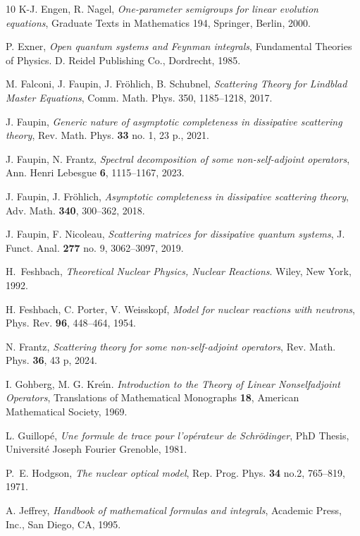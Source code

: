 \documentclass{article}
\begin{document}
\begin{thebibliography}{10}
K-J. Engen, R. Nagel, 
\emph{One-parameter semigroups for linear evolution equations},
Graduate Texts in Mathematics 194, Springer, Berlin, 2000.

P. Exner,
\emph{Open quantum systems and {F}eynman integrals},
Fundamental Theories of Physics. D. Reidel Publishing Co., Dordrecht, 1985.

M. Falconi, J. Faupin, J. Fr\"ohlich, B. Schubnel, 
\emph{Scattering {T}heory for {L}indblad {M}aster {E}quations}, 
Comm. Math. Phys. 350, 1185--1218, 2017.

J. Faupin,  
\emph{Generic nature of asymptotic completeness in dissipative scattering theory}, 
Rev. Math. Phys. {\bf 33} no. 1, 23 p., 2021.

J. Faupin, N. Frantz, 
\emph{Spectral decomposition of some non-self-adjoint operators},
Ann. Henri Lebesgue {\bf 6}, 1115--1167, 2023. 

J. Faupin, J. Fr\"ohlich, 
\emph{Asymptotic completeness in dissipative scattering theory}, 
Adv. Math. {\bf 340}, 300--362, 2018.

J. Faupin, F. Nicoleau, 
\emph{Scattering matrices for dissipative quantum systems}, 
J. Funct. Anal. {\bf 277} no. 9, 3062--3097, 2019.

H.~Feshbach,
\emph{Theoretical Nuclear Physics, Nuclear Reactions}.
Wiley, New York, 1992.

H. Feshbach, C. Porter, V. Weisskopf,
\emph{Model for nuclear reactions with neutrons},
Phys. Rev. {\bf 96}, 448--464, 1954.

N. Frantz, 
\emph{Scattering theory for some non-self-adjoint operators}, 
Rev. Math. Phys. {\bf 36},  43 p, 2024. 

I. Gohberg, M. G. Kre\'{\i}n.
\emph{Introduction to the Theory of Linear Nonselfadjoint Operators}, 
Translations of Mathematical Monographs {\bf 18}, American Mathematical Society, 1969.

L. Guillop\'{e},
\emph{Une formule de trace pour l'op\'{e}rateur de {S}chr\"{o}dinger}, 
PhD Thesis, Universit\'{e} Joseph Fourier Grenoble, 1981. 

P.~E. Hodgson,
\emph{The nuclear optical model},
Rep. Prog. Phys. {\bf 34} no.2, 765--819, 1971.

A. Jeffrey,
\emph{Handbook of mathematical formulas and integrals},
Academic Press, Inc., San Diego, CA, 1995.


\end{thebibliography}
\end{document}
